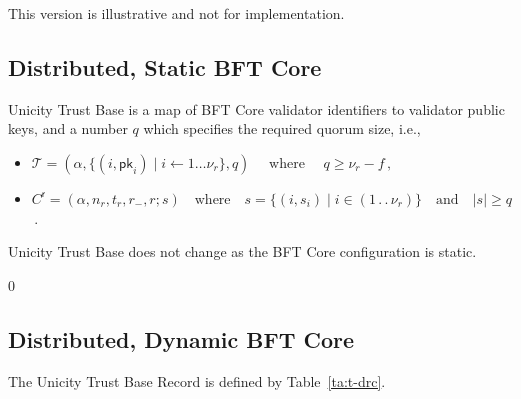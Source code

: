 This version is illustrative and not for implementation.


\subsection{Distributed, Static BFT Core}

Unicity Trust Base is a map of BFT Core validator identifiers to validator public keys, and a number $q$ which specifies the required quorum size, i.e.,
\begin{itemize}
    \item $\mathcal{T} = (\alpha, \{ (i, \mathsf{pk}_i)  \mid i \gets 1 \ldots \nu_r  \}, q) \quad\text{ where }\quad q \ge \nu_r - f \,,$
    \item $C^\mathsf{r} = (\alpha, n_r, t_r, r_-, r; s) \quad \text{where} \quad s = \{(i, s_i) \mid i \in (1 \,.\,.\, \nu_r)  \}  \quad \text{and} \quad \lvert s \rvert \ge q$\,. \\
\end{itemize}

Unicity Trust Base does not change as the BFT Core configuration is static.

\begin{algorithmic}[0]
        \State \Return $0$
    \EndIf
      \State {} 
    \EndIf
      \State {} 
    \EndIf
         \State {}   
      \EndIf
    \EndFor
    \State {}   
  \EndFunction
\end{algorithmic}


\subsection{Distributed, Dynamic BFT Core}\label{sec:ddrc}

The Unicity Trust Base Record is defined by Table~\ref{ta:t-drc}.


